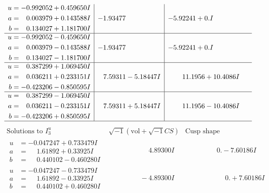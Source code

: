 \documentclass[1p]{elsarticle_modified}
\theoremstyle{definition}
\newcommand{\I}{\sqrt{-1}}
\begin{document}
$$\begin{array}{c|c|c}
\begin{aligned}
u &= -0.992052 + 0.459650 I \\
a &= \phantom{-}0.003979 + 0.143588 I \\
b &= \phantom{-}0.134027 + 1.181700 I\end{aligned}
 & -1.93477\phantom{ +0.000000I} & -5.92241 + 0. I\phantom{ +0.000000I} \\ \hline\begin{aligned}
u &= -0.992052 - 0.459650 I \\
a &= \phantom{-}0.003979 - 0.143588 I \\
b &= \phantom{-}0.134027 - 1.181700 I\end{aligned}
 & -1.93477\phantom{ +0.000000I} & -5.92241 + 0. I\phantom{ +0.000000I} \\ \hline\begin{aligned}
u &= \phantom{-}0.387299 + 1.069450 I \\
a &= \phantom{-}0.036211 + 0.233151 I \\
b &= -0.423206 - 0.850595 I\end{aligned}
 & \phantom{-}7.59311 - 5.18447 I & \phantom{-}11.1956 + 10.4086 I \\ \hline\begin{aligned}
u &= \phantom{-}0.387299 - 1.069450 I \\
a &= \phantom{-}0.036211 - 0.233151 I \\
b &= -0.423206 + 0.850595 I\end{aligned}
 & \phantom{-}7.59311 + 5.18447 I & \phantom{-}11.1956 - 10.4086 I\\
 \hline 
 \end{array}$$\newpage$$\begin{array}{c|c|c}  
\text{Solutions to }I^u_{3}& \I (\text{vol} + \sqrt{-1}CS) & \text{Cusp shape}\\
 \hline 
\begin{aligned}
u &= -0.047247 + 0.733479 I \\
a &= \phantom{-}1.61892 + 0.33925 I \\
b &= \phantom{-}0.440102 - 0.460280 I\end{aligned}
 & \phantom{-0.000000 -}4.89300 I & \phantom{-0.000000 } 0. - 7.60186 I \\ \hline\begin{aligned}
u &= -0.047247 - 0.733479 I \\
a &= \phantom{-}1.61892 - 0.33925 I \\
b &= \phantom{-}0.440102 + 0.460280 I\end{aligned}
 & \phantom{-0.000000 } -4.89300 I & \phantom{-0.000000 -}0. + 7.60186 I \\ \hline\begin{aligned}

\end{aligned}
\end{array}$$
\end{document}
